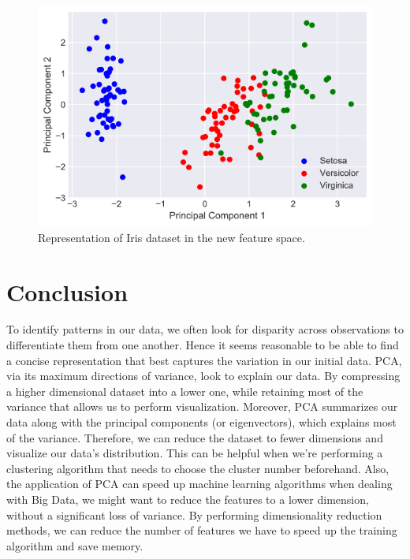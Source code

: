 \documentclass[conference]{IEEEtran}
\begin{document}
\begin{figure}[h]
\centerline{\includegraphics[scale=0.4]{PC1_PC2_dark.png}}
\caption{Representation of Iris dataset in the new feature space.}
\label{fig}
\end{figure}


\section{Conclusion}

To identify patterns in our data, we often look for disparity across observations to differentiate them from one another. Hence it seems reasonable to be able to find a concise representation that best captures the variation in our initial data. PCA, via its maximum directions of variance, look to explain our data. By compressing a higher dimensional dataset into a lower one, while retaining most of the variance that allows us to perform visualization. Moreover, PCA summarizes our data along with the principal components (or eigenvectors), which explains most of the variance. Therefore, we can reduce the dataset to fewer dimensions and visualize our data's distribution. This can be helpful when we're performing a clustering algorithm that needs to choose the cluster number beforehand. Also, the application of PCA can speed up machine learning algorithms when dealing with Big Data, we might want to reduce the features to a lower dimension, without a significant loss of variance. By performing dimensionality reduction methods, we can reduce the number of features we have to speed up the training algorithm and save memory. 
\end{document}
